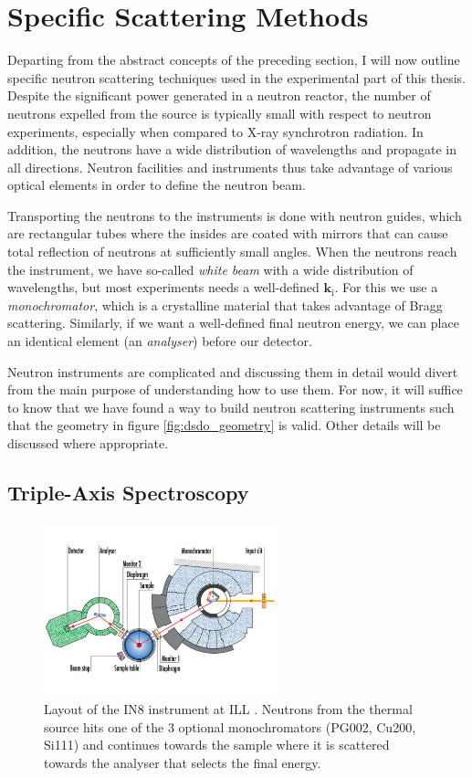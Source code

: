 \section{Specific Scattering Methods}\label{sec:specific_neutron}
Departing from the abstract concepts of the preceding section, I will now outline specific neutron scattering techniques used in the experimental part of this thesis. Despite the significant power generated in a neutron reactor, the number of neutrons expelled from the source is typically small with respect to neutron experiments, especially when compared to X-ray synchrotron radiation. In addition, the neutrons have a wide distribution of wavelengths and propagate in all directions. Neutron facilities and instruments thus take advantage of various optical elements in order to define the neutron beam.

Transporting the neutrons to the instruments is done with neutron guides, which are rectangular tubes where the insides are coated with mirrors that can cause total reflection of neutrons at sufficiently small angles. When the neutrons reach the instrument, we have so-called \emph{white beam} with a wide distribution of wavelengths, but most experiments needs a well-defined $\bm{k}_\text{i}$. For this we use a \emph{monochromator}, which is a crystalline material that takes advantage of Bragg scattering. Similarly, if we want a well-defined final neutron energy, we can place an identical element (an \emph{analyser}) before our detector.

Neutron instruments are complicated and discussing them in detail would divert from the main purpose of understanding how to use them. For now, it will suffice to know that we have found a way to build neutron scattering instruments such that the geometry in figure \ref{fig:dsdo_geometry} is valid. Other details will be discussed where appropriate.

\subsection{Triple-Axis Spectroscopy}

\begin{figure}
	\centering
	\includegraphics[width=0.6\textwidth]{fig/method/ns/in8.jpg}
	\caption[in8 layout]{Layout of the IN8 instrument at ILL \cite{in8}. Neutrons from the thermal source hits one of the 3 optional monochromators (PG002, Cu200, Si111) and continues towards the sample where it is scattered towards the analyser that selects the final energy.}
	\label{fig:in8}
\end{figure}

